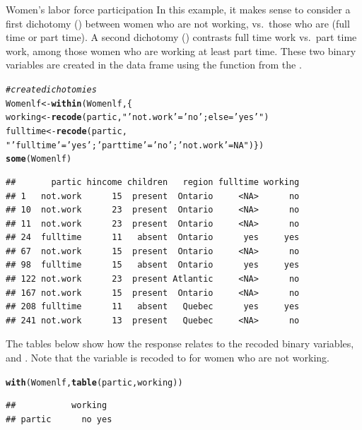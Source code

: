 \documentclass[11pt]{book}\usepackage[]{graphicx}\usepackage[]{color}
\makeatletter
\newcommand{\hlstr}[1]{\textcolor[rgb]{0.192,0.494,0.8}{#1}}%
\newcommand{\hlcom}[1]{\textcolor[rgb]{0.678,0.584,0.686}{\textit{#1}}}%
\newcommand{\hlstd}[1]{\textcolor[rgb]{0.345,0.345,0.345}{#1}}%
\newcommand{\hlkwb}[1]{\textcolor[rgb]{0.69,0.353,0.396}{#1}}%
\newcommand{\hlkwd}[1]{\textcolor[rgb]{0.737,0.353,0.396}{\textbf{#1}}}%
\newenvironment{kframe}{%
 \def\at@end@of@kframe{}%
 \ifinner\ifhmode%
  \def\at@end@of@kframe{\end{minipage}}%
  \begin{minipage}{\columnwidth}%
 \fi\fi%
 \def\FrameCommand##1{\hskip\@totalleftmargin \hskip-\fboxsep
 \colorbox{shadecolor}{##1}\hskip-\fboxsep
     \hskip-\linewidth \hskip-\@totalleftmargin \hskip\columnwidth}%
 \MakeFramed {\advance\hsize-\width
   \@totalleftmargin\z@ \linewidth\hsize
   \@setminipage}}%
 {\par\unskip\endMakeFramed%
 \at@end@of@kframe}
\newenvironment{knitrout}{}{} %
\renewenvironment{knitrout}{\small\renewcommand{\baselinestretch}{.85}}{} %
\makeatother
\begin{document}
\begin{Example}[wlfpart1]{Women's labor force participation}
In this example, it makes sense to consider a first dichotomy
()
between women who are not working, vs.\ those who are
(full time or part time).
A second dichotomy () contrasts
full time work vs.\ part time work, among those women who are 
working at least part time.
These two binary variables are created in the data frame
using the  function from the .
\begin{knitrout}
\color{fgcolor}\begin{kframe}
\begin{alltt}
\hlcom{# create dichotomies}
\hlstd{Womenlf} \hlkwb{<-} \hlkwd{within}\hlstd{(Womenlf,\{}
  \hlstd{working} \hlkwb{<-}  \hlkwd{recode}\hlstd{(partic,} \hlstr{" 'not.work' = 'no'; else = 'yes' "}\hlstd{)}
  \hlstd{fulltime} \hlkwb{<-} \hlkwd{recode}\hlstd{(partic,}
    \hlstr{" 'fulltime' = 'yes'; 'parttime' = 'no'; 'not.work' = NA"}\hlstd{)\})}
\hlkwd{some}\hlstd{(Womenlf)}
\end{alltt}
\begin{verbatim}
##       partic hincome children   region fulltime working
## 1   not.work      15  present  Ontario     <NA>      no
## 10  not.work      23  present  Ontario     <NA>      no
## 11  not.work      23  present  Ontario     <NA>      no
## 24  fulltime      11   absent  Ontario      yes     yes
## 67  not.work      15  present  Ontario     <NA>      no
## 98  fulltime      15   absent  Ontario      yes     yes
## 122 not.work      23  present Atlantic     <NA>      no
## 167 not.work      15  present  Ontario     <NA>      no
## 208 fulltime      11   absent   Quebec      yes     yes
## 241 not.work      13  present   Quebec     <NA>      no
\end{verbatim}
\end{kframe}
\end{knitrout}
The tables below show how
the response  relates to the recoded binary
variables,  and .
Note that the  variable is recoded to 
for women who are not working.  
\begin{knitrout}
\color{fgcolor}\begin{kframe}
\begin{alltt}
\hlkwd{with}\hlstd{(Womenlf,} \hlkwd{table}\hlstd{(partic, working))}
\end{alltt}
\begin{verbatim}
##           working
## partic      no yes

\end{verbatim}
\end{kframe}
\end{knitrout}
\end{Example}
\end{document}
